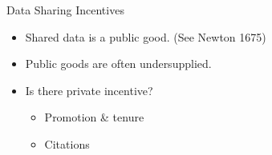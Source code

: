 \documentclass{beamer}
\begin{document}
\begin{frame}{Data Sharing Incentives}{}

  \begin{itemize}
  \item
    Shared data is a public good. (See Newton 1675)
  \item
    Public goods are often undersupplied.
  \item 
  	 Is there private incentive?
  	 \begin{itemize}
  	 \item Promotion \& tenure
  	 \item Citations
  	 \end{itemize} 
  \end{itemize}
\end{frame}

\end{document}
